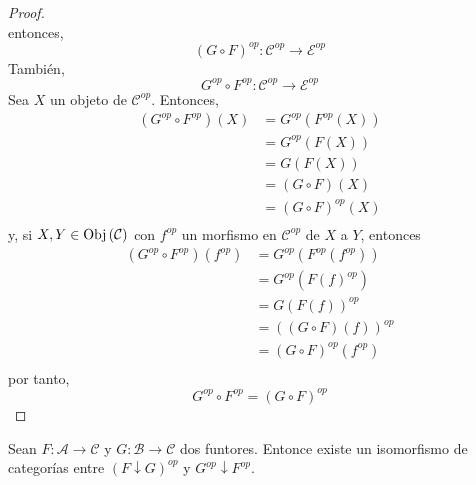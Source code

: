 \documentclass[12pt]{report}
\theoremstyle{largebreak}
\newcommand\cf[3]{\ensuremath{#1:#2\rightarrow#3}}
\newcommand{\Obj}[1]{\ensuremath{\textup{Obj}\left(#1\right)}}
\begin{document}
\begin{proof}
\begin{equation*}
        \end{equation*}
        entonces,
        \begin{equation*}
            \cf{(G\circ F)^{op}}{\mathcal{C}^{op}}{\mathcal{E}^{op}}
        \end{equation*}
        También,
        \begin{equation*}
            \cf{G^{op}\circ F^{op}}{\mathcal{C}^{op}}{\mathcal{E}^{op}}
        \end{equation*}
        Sea $X$ un objeto de $\mathcal{C}^{op}$. Entonces,
        \begin{equation*}
            \begin{split}
                (G^{op}\circ F^{op})(X)&=G^{op}(F^{op}(X))\\
                &=G^{op}(F(X))\\
                &=G(F(X))\\
                &=(G\circ F)(X)\\
                &=(G\circ F)^{op}(X)\\
            \end{split}
        \end{equation*}
        y, si $X,Y\in\Obj{\mathcal{C}}$ con $f^{op}$ un morfismo en $\mathcal{C}^{op}$ de $X$ a $Y$, entonces
        \begin{equation*}
            \begin{split}
                (G^{op}\circ F^{op})(f^{op})&=G^{op}(F^{op}(f^{op}))\\
                &=G^{op}(F(f)^{op})\\
                &=G(F(f))^{op}\\
                &=((G\circ F)(f))^{op}\\
                &=(G\circ F)^{op}(f^{op})\\
            \end{split}
        \end{equation*}
        por tanto,
        \begin{equation*}
            G^{op}\circ F^{op}=(G\circ F)^{op}
        \end{equation*}
    \end{proof}


    \renewcommand{\theenumi}{\arabic{enumi}}

    \begin{propo}
        Sean $\cf{F}{\mathcal{A}}{\mathcal{C}}$ y $\cf{G}{\mathcal{B}}{\mathcal{C}}$ dos funtores. Entonce existe un isomorfismo de categorías entre $(F\downarrow G)^{op}$ y $G^{op}\downarrow F^{op}$.
    \end{propo}
\end{document}
